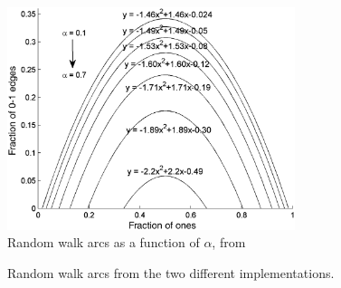 \documentclass[11pt]{article}
\begin{document}
\begin{figure}
  \centering
  \includegraphics[height=65mm]{durretArcs}
  \caption{Random walk arcs as a function of $\alpha$, from \cite{durret:pnas12}}
  \label{fig:durretArcs}
\end{figure}

\begin{figure}
  \centering
  \hspace{3mm}
  \caption{Random walk arcs from the two different implementations.}
  \label{fig:myArcs}
\end{figure}
\end{document}
